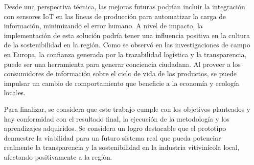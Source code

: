 Desde una perspectiva técnica, las mejoras futuras podrían incluir la integración con sensores IoT en las líneas de producción para automatizar la carga de información, minimizando el error humano. A nivel de impacto, la implementación de esta solución podría tener una influencia positiva en la cultura de la sostenibilidad en la región. Como se observó en las investigaciones de campo en Europa, la confianza generada por la trazabilidad logística y la transparencia, puede ser una herramienta para generar conciencia ciudadana. Al proveer a los consumidores de información sobre el ciclo de vida de los productos, se puede impulsar un cambio de comportamiento que beneficie a la economía y ecología locales.

Para finalizar, se considera que este trabajo cumple con los objetivos planteados y hay conformidad con el resultado final, la ejecución de la metodología y los aprendizajes adquiridos. Se considera un logro destacable que el prototipo demuestre la viabilidad para un futuro sistema real que pueda potenciar realmente la transparencia y la sostenibilidad en la industria vitivinícola local, afectando positivamente a la región.
